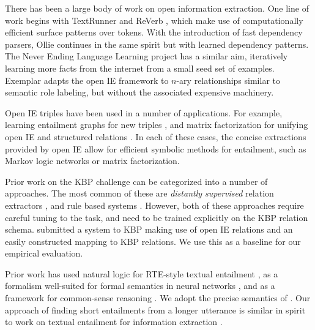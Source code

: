 There has been a large body of work on open information extraction.
One line of work begins with
  TextRunner \cite{key:2007yates-textrunner} and
  ReVerb \cite{key:2011fader-reverb}, which make use of computationally
  efficient surface patterns over tokens.
With the introduction of fast dependency parsers,
  Ollie \cite{key:2012mausam-ollie} continues in the same spirit but with
  learned dependency patterns.
The Never Ending Language Learning project \cite{key:2010carlson-nell}
  has a similar aim, iteratively learning more facts from the internet
  from a small seed set of examples.
Exemplar \cite{key:2013mesquita-exemplar} adapts the open IE framework to
  $n$-ary relationships similar to semantic role labeling, but without the
  associated expensive machinery.

Open IE triples have been used in a number of applications.
For example, learning entailment graphs for new triples
  \cite{key:2011berant-entailment}, and
  matrix factorization for unifying open IE and structured relations
  \cite{key:2012yao-schemas,key:2013riedel-schemas}.
In each of these cases, the concise extractions provided by open IE allow
  for efficient symbolic methods for entailment, such as Markov logic
  networks or matrix factorization.

Prior work on the KBP challenge can be categorized into a number of approaches.
The most common of these are \textit{distantly supervised} relation extractors
  \cite{key:1999craven-distsup,key:2007wu-distsup,key:2009mintz-distsup,key:2011sun-kbp},
  and rule based systems
  \cite{key:1997soderland-kbp,key:2010grishman-kbp,key:2010chen-kbp}.
However, both of these approaches require careful tuning to the task, and
  need to be trained explicitly on the KBP relation schema.
 submitted a system to KBP making use of
  open IE relations and an easily constructed mapping to KBP relations.
We use this as a baseline for our empirical evaluation.

Prior work has used natural logic \cite{key:2008vanbenthem-natlog} 
  for RTE-style textual entailment \cite{key:2009maccartney-natlog}, as
  a formalism well-suited for formal semantics in neural networks
  \cite{key:2013bowman-natlog}, and as a framework for common-sense reasoning
  \cite{key:2013angeli-truth}.
We adopt the precise semantics of .
Our approach of finding short entailments from a longer utterance is similar
  in spirit to work on textual entailment for information extraction
  \cite{key:2006romano-ie}.

